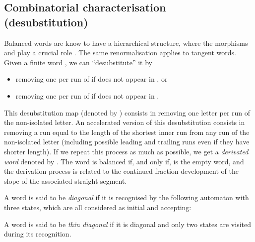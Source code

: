 \documentclass[preliminary]{eptcs}
\begin{document}
\subsection{Combinatorial characterisation (desubstitution)}

Balanced words are know to have a hierarchical structure, where the
morphisms  and  play a crucial role \cite{PytheasFogg2002}
\cite{Lothaire2002}.
The same renormalisation applies to tangent words.
\newline
Given a finite word , we can ``desubstitute'' it by 
\begin{itemize}
\item removing one  per run of  if  does not appear in , or
\item removing one  per run of  if  does not appear in .
\end{itemize}
This desubstitution map (denoted by ) consists in removing one
letter per run of the non-isolated letter. An accelerated version of this
desubstitution consists in removing a run equal to the length of the
shortest inner run from any run of the non-isolated letter (including
possible leading and trailing runs even if they have shorter length). 
\newline
If we repeat this process as much as possible, we get a \emph{derivated
word} denoted by . The word  is balanced if, and only if, 
is the empty word, and the derivation process is related to the continued
fraction development of the slope of the associated straight segment.


A word is said to be \emph{diagonal} if it is recognised by the following
automaton with three states, which are all considered as initial and
accepting: 
\begin{center}
\end{center}


A word is said to be \emph{thin diagonal} if it is diagonal and only two
states are visited during its recognition.
\end{document}
